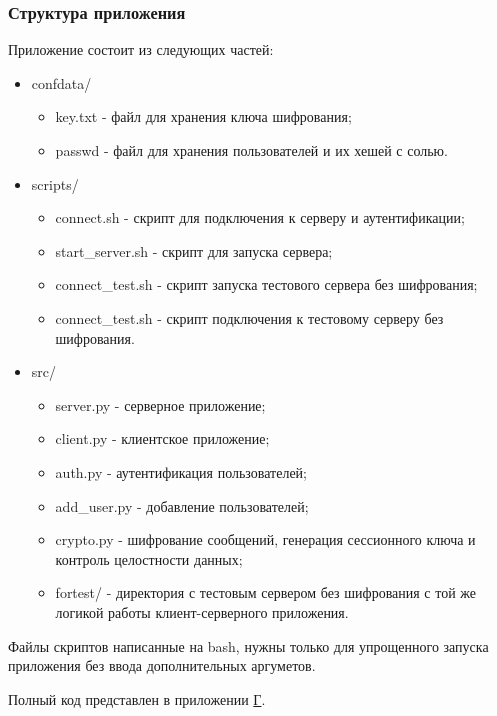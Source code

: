 \documentclass[areasetadvanced]{scrartcl}
\begin{document}
\subsubsection{Структура приложения}

Приложение состоит из следующих частей:
\begin{itemize}
    \item confdata/ \begin{itemize}
            \item key.txt - файл для хранения ключа шифрования;
            \item passwd - файл для хранения пользователей и их хешей с солью.
        \end{itemize}
    \item scripts/ \begin{itemize}
            \item connect.sh - скрипт для подключения к серверу и аутентификации;
            \item start\_server.sh - скрипт для запуска сервера;
            \item connect\_test.sh - скрипт запуска тестового сервера без шифрования;
            \item connect\_test.sh - скрипт подключения к тестовому серверу без шифрования.
        \end{itemize}
    \item src/ \begin{itemize}
            \item server.py - серверное приложение;
            \item client.py - клиентское приложение;
            \item auth.py - аутентификация пользователей;
            \item add\_user.py - добавление пользователей;
            \item crypto.py - шифрование сообщений, генерация сессионного ключа и контроль целостности данных;
            \item fortest/ - директория с тестовым сервером без шифрования с той же логикой работы клиент-серверного приложения.
        \end{itemize}
\end{itemize}

Файлы скриптов написанные на bash, нужны только для упрощенного запуска приложения без ввода дополнительных аргуметов. 

Полный код представлен в приложении \hyperref[sec:pril5]{Г}. 
\end{document}
